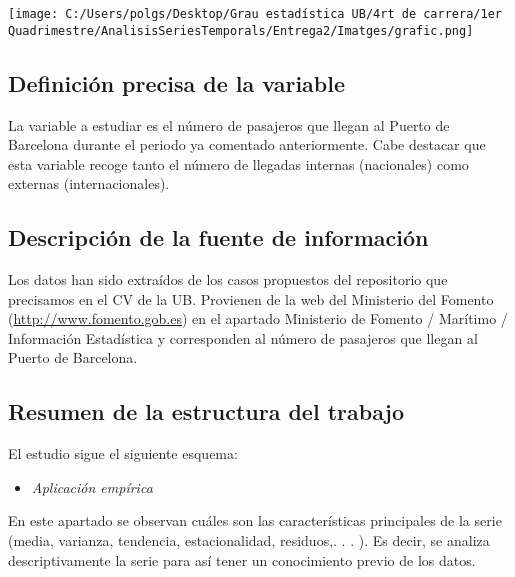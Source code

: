 \documentclass[
]{article}
\providecommand{\tightlist}{%
  \setlength{\itemsep}{0pt}\setlength{\parskip}{0pt}}
\begin{document}
\smallskip

\texttt{[image: C:/Users/polgs/Desktop/Grau estadística UB/4rt de carrera/1er Quadrimestre/AnalisisSeriesTemporals/Entrega2/Imatges/grafic.png]}

\hypertarget{definiciuxf3n-precisa-de-la-variable}{%
\subsection{Definición precisa de la
variable}\label{definiciuxf3n-precisa-de-la-variable}}

La variable a estudiar es el número de pasajeros que llegan al Puerto de
Barcelona durante el periodo ya comentado anteriormente. Cabe destacar
que esta variable recoge tanto el número de llegadas internas
(nacionales) como externas (internacionales).

\hypertarget{descripciuxf3n-de-la-fuente-de-informaciuxf3n}{%
\subsection{Descripción de la fuente de
información}\label{descripciuxf3n-de-la-fuente-de-informaciuxf3n}}

Los datos han sido extraídos de los casos propuestos del repositorio que
precisamos en el CV de la UB. Provienen de la web del Ministerio del
Fomento (\url{http://www.fomento.gob.es}) en el apartado Ministerio de
Fomento / Marítimo / Información Estadística y corresponden al número de
pasajeros que llegan al Puerto de Barcelona.

\hypertarget{resumen-de-la-estructura-del-trabajo}{%
\subsection{Resumen de la estructura del
trabajo}\label{resumen-de-la-estructura-del-trabajo}}

El estudio sigue el siguiente esquema:

\begin{itemize}
\tightlist
\item
  \emph{Aplicación empírica}
\end{itemize}

En este apartado se observan cuáles son las características principales
de la serie (media, varianza, tendencia, estacionalidad, residuos,. . .
). Es decir, se analiza descriptivamente la serie para así tener un
conocimiento previo de los datos.
\end{document}
